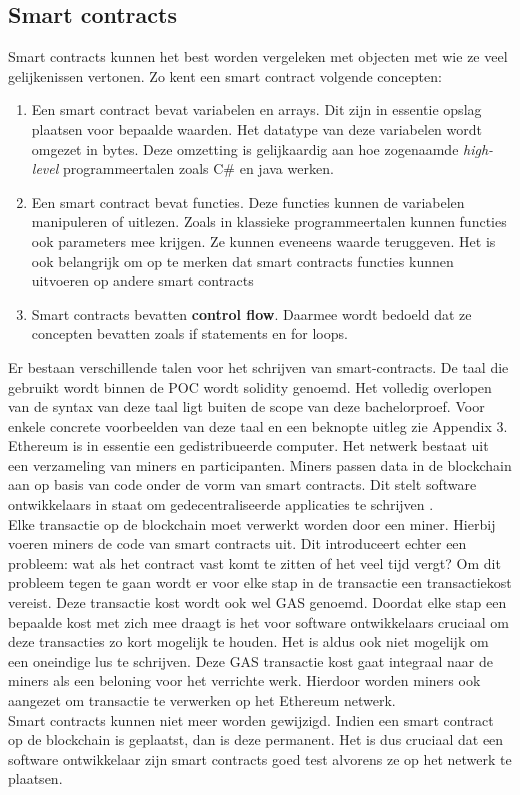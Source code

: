 \subsection{Smart contracts}
Smart contracts kunnen het best worden vergeleken met objecten met wie ze veel gelijkenissen vertonen. Zo kent een smart contract volgende concepten:

\begin{enumerate}
\item Een smart contract bevat variabelen en arrays. Dit zijn in essentie opslag plaatsen voor bepaalde waarden. Het datatype van deze variabelen wordt omgezet in bytes. Deze omzetting is gelijkaardig aan hoe zogenaamde \textit{high-level} programmeertalen zoals C\# en java werken.\\
\item Een smart contract bevat functies. Deze functies kunnen de variabelen manipuleren of uitlezen. Zoals in klassieke programmeertalen kunnen functies ook parameters mee krijgen. Ze kunnen eveneens waarde teruggeven. Het is ook belangrijk om op te merken dat smart contracts functies kunnen uitvoeren op andere smart contracts\
\item Smart contracts bevatten \textbf{control flow}. Daarmee wordt bedoeld dat ze concepten bevatten zoals if statements en for loops.
\end{enumerate}

Er bestaan verschillende talen voor het schrijven van smart-contracts. De taal die gebruikt wordt binnen de POC wordt solidity genoemd. Het volledig overlopen van de syntax van deze taal ligt buiten de scope van deze bachelorproef. Voor enkele concrete voorbeelden van deze taal en een beknopte uitleg zie Appendix 3.\\

Ethereum is in essentie een gedistribueerde computer. Het netwerk bestaat uit een verzameling van miners en participanten. Miners passen data in de blockchain aan op basis van code onder de vorm van smart contracts. Dit stelt software ontwikkelaars in staat om gedecentraliseerde applicaties te schrijven .\\

Elke transactie op de blockchain moet verwerkt worden door een miner. Hierbij voeren miners de code van smart contracts uit. Dit introduceert echter een probleem: wat als het contract vast komt te zitten of het veel tijd vergt? Om dit probleem tegen te gaan wordt er voor elke stap in de transactie een transactiekost vereist. Deze transactie kost wordt ook wel GAS genoemd. Doordat elke stap een bepaalde kost met zich mee draagt is het voor software ontwikkelaars cruciaal om deze transacties zo kort mogelijk te houden. Het is aldus ook niet mogelijk om een oneindige lus te schrijven. Deze GAS transactie kost gaat integraal naar de miners als een beloning voor het verrichte werk. Hierdoor worden miners ook aangezet om transactie te verwerken op het Ethereum netwerk.\\

Smart contracts kunnen niet meer worden gewijzigd. Indien een smart contract op de blockchain is geplaatst, dan is deze permanent. Het is dus cruciaal dat een software ontwikkelaar zijn smart contracts goed test alvorens ze op het netwerk te plaatsen.